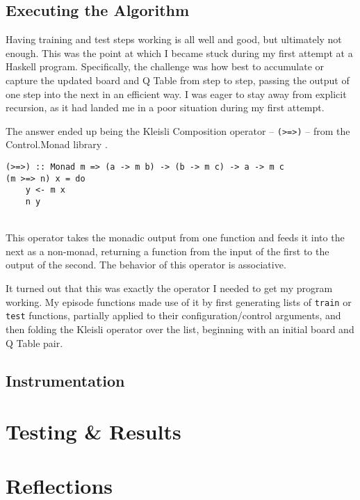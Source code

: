 \documentclass[12pt,a4paper]{article}
\begin{document}
		\subsection{Executing the Algorithm}
		
		\par Having training and test steps working is all well and good, but ultimately not enough. This was the point at which I became stuck during my first attempt at a Haskell program. Specifically, the challenge was how best to accumulate or capture the updated board and Q Table from step to step, passing the output of one step into the next in an efficient way. I was eager to stay away from explicit recursion, as it had landed me in a poor situation during my first attempt.
		\par The answer ended up being the Kleisli Composition operator -- \texttt{(>=>)} -- from the Control.Monad library \cite{kleisli}. \\
		
		\begin{lstlisting}
(>=>) :: Monad m => (a -> m b) -> (b -> m c) -> a -> m c
(m >=> n) x = do
	y <- m x
	n y
		\end{lstlisting}\ \\
		
		This operator takes the monadic output from one function and feeds it into the next as a non-monad, returning a function from the input of the first to the output of the second. The behavior of this operator is associative.
		\par It turned out that this was exactly the operator I needed to get my program working. My episode functions made use of it by first generating lists of \texttt{train} or \texttt{test} functions, partially applied to their configuration/control arguments, and then folding the Kleisli operator over the list, beginning with an initial board and Q Table pair.
		
		\subsection{Instrumentation}
		

		
			
	\section{Testing \& Results}
	
	\section{Reflections}
\end{document}
